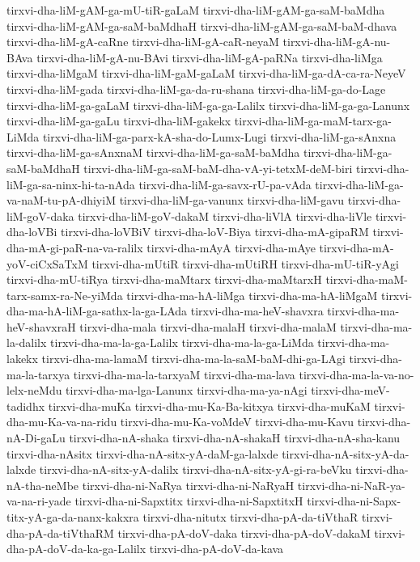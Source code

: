 {tirxvi-dha-liM-gAM-ga-mU-tiR-gaLaM
tirxvi-dha-liM-gAM-ga-saM-baMdha
tirxvi-dha-liM-gAM-ga-saM-baMdhaH
tirxvi-dha-liM-gAM-ga-saM-baM-dhava
tirxvi-dha-liM-gA-caRne
tirxvi-dha-liM-gA-caR-neyaM
tirxvi-dha-liM-gA-nu-BAva
tirxvi-dha-liM-gA-nu-BAvi
tirxvi-dha-liM-gA-paRNa
tirxvi-dha-liMga
tirxvi-dha-liMgaM
tirxvi-dha-liM-gaM-gaLaM
tirxvi-dha-liM-ga-dA-ca-ra-NeyeV
tirxvi-dha-liM-gada
tirxvi-dha-liM-ga-da-ru-shana
tirxvi-dha-liM-ga-do-Lage
tirxvi-dha-liM-ga-gaLaM
tirxvi-dha-liM-ga-ga-Lalilx
tirxvi-dha-liM-ga-ga-Lanunx
tirxvi-dha-liM-ga-gaLu
tirxvi-dha-liM-gakekx
tirxvi-dha-liM-ga-maM-tarx-ga-LiMda
tirxvi-dha-liM-ga-parx-kA-sha-do-Lumx-Lugi
tirxvi-dha-liM-ga-sAnxna
tirxvi-dha-liM-ga-sAnxnaM
tirxvi-dha-liM-ga-saM-baMdha
tirxvi-dha-liM-ga-saM-baMdhaH
tirxvi-dha-liM-ga-saM-baM-dha-vA-yi-tetxM-deM-biri
tirxvi-dha-liM-ga-sa-ninx-hi-ta-nAda
tirxvi-dha-liM-ga-savx-rU-pa-vAda
tirxvi-dha-liM-ga-va-naM-tu-pA-dhiyiM
tirxvi-dha-liM-ga-vanunx
tirxvi-dha-liM-gavu
tirxvi-dha-liM-goV-daka
tirxvi-dha-liM-goV-dakaM
tirxvi-dha-liVlA
tirxvi-dha-liVle
tirxvi-dha-loVBi
tirxvi-dha-loVBiV
tirxvi-dha-loV-Biya
tirxvi-dha-mA-gipaRM
tirxvi-dha-mA-gi-paR-na-va-ralilx
tirxvi-dha-mAyA
tirxvi-dha-mAye
tirxvi-dha-mA-yoV-ciCxSaTxM
tirxvi-dha-mUtiR
tirxvi-dha-mUtiRH
tirxvi-dha-mU-tiR-yAgi
tirxvi-dha-mU-tiRya
tirxvi-dha-maMtarx
tirxvi-dha-maMtarxH
tirxvi-dha-maM-tarx-samx-ra-Ne-yiMda
tirxvi-dha-ma-hA-liMga
tirxvi-dha-ma-hA-liMgaM
tirxvi-dha-ma-hA-liM-ga-sathx-la-ga-LAda
tirxvi-dha-ma-heV-shavxra
tirxvi-dha-ma-heV-shavxraH
tirxvi-dha-mala
tirxvi-dha-malaH
tirxvi-dha-malaM
tirxvi-dha-ma-la-dalilx
tirxvi-dha-ma-la-ga-Lalilx
tirxvi-dha-ma-la-ga-LiMda
tirxvi-dha-ma-lakekx
tirxvi-dha-ma-lamaM
tirxvi-dha-ma-la-saM-baM-dhi-ga-LAgi
tirxvi-dha-ma-la-tarxya
tirxvi-dha-ma-la-tarxyaM
tirxvi-dha-ma-lava
tirxvi-dha-ma-la-va-no-lelx-neMdu
tirxvi-dha-ma-lga-Lanunx
tirxvi-dha-ma-ya-nAgi
tirxvi-dha-meV-tadidhx
tirxvi-dha-muKa
tirxvi-dha-mu-Ka-Ba-kitxya
tirxvi-dha-muKaM
tirxvi-dha-mu-Ka-va-na-ridu
tirxvi-dha-mu-Ka-voMdeV
tirxvi-dha-mu-Kavu
tirxvi-dha-nA-Di-gaLu
tirxvi-dha-nA-shaka
tirxvi-dha-nA-shakaH
tirxvi-dha-nA-sha-kanu
tirxvi-dha-nAsitx
tirxvi-dha-nA-sitx-yA-daM-ga-lalxde
tirxvi-dha-nA-sitx-yA-da-lalxde
tirxvi-dha-nA-sitx-yA-dalilx
tirxvi-dha-nA-sitx-yA-gi-ra-beVku
tirxvi-dha-nA-tha-neMbe
tirxvi-dha-ni-NaRya
tirxvi-dha-ni-NaRyaH
tirxvi-dha-ni-NaR-ya-va-na-ri-yade
tirxvi-dha-ni-Sapxtitx
tirxvi-dha-ni-SapxtitxH
tirxvi-dha-ni-Sapx-titx-yA-ga-da-nanx-kakxra
tirxvi-dha-nitutx
tirxvi-dha-pA-da-tiVthaR
tirxvi-dha-pA-da-tiVthaRM
tirxvi-dha-pA-doV-daka
tirxvi-dha-pA-doV-dakaM
tirxvi-dha-pA-doV-da-ka-ga-Lalilx
tirxvi-dha-pA-doV-da-kava
}

